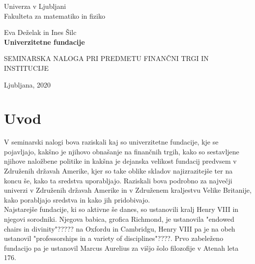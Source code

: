 \documentclass[12pt, a4paper]{article}
\begin{document}
\begin{titlepage}
\begin{center}

\large
Univerza v Ljubljani\\
\normalsize
Fakulteta za matematiko in fiziko\\

\vspace{3 cm} 

\large
Eva Deželak in Ines Šilc\\

\vspace{0.5cm}
\LARGE
\textbf{Univerzitetne fundacije}

\vspace{0.5 cm}
\normalsize


\vspace{1.5cm}
\normalsize
SEMINARSKA NALOGA PRI PREDMETU FINANČNI TRGI IN INSTITUCIJE

\vspace{3cm}


\vfill

\large Ljubljana, 2020

\end{center}
\end{titlepage}

\newpage

\tableofcontents

\listoffigures

\newpage

\section{Uvod}

V seminarski nalogi bova raziskali kaj so univerzitetne fundacije, kje se pojavljajo, kakšno je njihovo obnašanje na finančnih trgih, kako so sestavljene njihove naložbene politike in kakšna je dejanska velikost fundacij predvsem v Združenih državah Amerike, kjer so take oblike skladov najizrazitejše ter na koncu še, kako ta sredstva uporabljajo. Raziskali bova podrobno za največji univerzi v Združenih državah Amerike in v Združenem kraljestvu Velike Britanije, kako porabljajo sredstva in kako jih pridobivajo.\\

Najstarejše fundacije, ki so aktivne še danes, so ustanovili kralj Henry VIII in njegovi sorodniki. Njegova babica, grofica Richmond, je ustanovila "endowed chairs in divinity"????? na Oxfordu in Cambridgu, Henry VIII pa je na obeh ustanovil "professorships in a variety of disciplines"????. Prvo zabeleženo fundacijo pa je ustanovil Marcus Aurelius za višjo šolo filozofije v Atenah leta 176. \cite{Investopedia}
\end{document}
